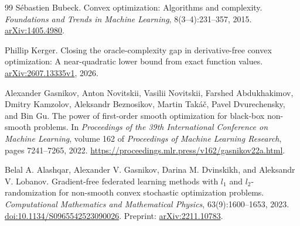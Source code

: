 \documentclass[11pt]{article}
\numberwithin{equation}{section}
\theoremstyle{remark}
\theoremstyle{definition}
\begin{document}
\begin{thebibliography}{99}
S\'ebastien Bubeck.
\newblock Convex optimization: Algorithms and complexity.
\newblock \emph{Foundations and Trends in Machine Learning}, 8(3--4):231--357, 2015.
\newblock \href{https://arxiv.org/abs/1405.4980}{arXiv:1405.4980}.

Phillip Kerger.
\newblock Closing the oracle-complexity gap in derivative-free convex optimization:
A near-quadratic lower bound from exact function values.
\newblock \href{https://arxiv.org/abs/2607.13335v1}{arXiv:2607.13335v1}, 2026.

Alexander Gasnikov, Anton Novitskii, Vasilii Novitskii, Farshed Abdukhakimov,
Dmitry Kamzolov, Aleksandr Beznosikov, Martin Tak\'a\v{c},
Pavel Dvurechensky, and Bin Gu.
\newblock The power of first-order smooth optimization for black-box non-smooth problems.
\newblock In \emph{Proceedings of the 39th International Conference on Machine Learning},
volume 162 of \emph{Proceedings of Machine Learning Research}, pages 7241--7265, 2022.
\newblock \url{https://proceedings.mlr.press/v162/gasnikov22a.html}.

Belal A. Alashqar, Alexander V. Gasnikov, Darina M. Dvinskikh, and Aleksandr V. Lobanov.
\newblock Gradient-free federated learning methods with $l_1$ and $l_2$-randomization
for non-smooth convex stochastic optimization problems.
\newblock \emph{Computational Mathematics and Mathematical Physics},
63(9):1600--1653, 2023.
\newblock \href{https://doi.org/10.1134/S0965542523090026}{doi:10.1134/S0965542523090026}.
\newblock Preprint: \href{https://arxiv.org/abs/2211.10783}{arXiv:2211.10783}.

\end{thebibliography}
\end{document}
